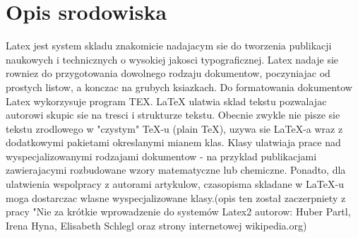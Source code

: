 \documentclass{article}
\begin{document}
\section{Opis srodowiska}
Latex jest system skladu znakomicie nadajacym sie do tworzenia publikacji naukowych i technicznych o wysokiej jakosci typograficznej. Latex nadaje sie rowniez do przygotowania dowolnego rodzaju dokumentow, poczyniajac od prostych listow, a konczac na grubych ksiazkach. Do formatowania dokumentow Latex wykorzysuje program TEX. LaTeX ulatwia sklad tekstu pozwalajac autorowi skupic sie na tresci i strukturze tekstu.
Obecnie zwykle nie pisze sie tekstu zrodlowego w "czystym" TeX-u (plain TeX), uzywa sie LaTeX-a wraz z dodatkowymi pakietami okreslanymi mianem klas. Klasy ulatwiaja prace nad wyspecjalizowanymi rodzajami dokumentow - na przyklad publikacjami zawierajacymi rozbudowane wzory matematyczne lub chemiczne. Ponadto, dla ulatwienia wspolpracy z autorami artykulow, czasopisma skladane w LaTeX-u moga dostarczac wlasne wyspecjalizowane klasy.(opis ten został zaczerpniety z pracy "Nie za krótkie wprowadzenie do systemów Latex2 autorow: Huber Partl, Irena Hyna, Elisabeth Schlegl oraz strony internetowej wikipedia.org)
\end{document}
